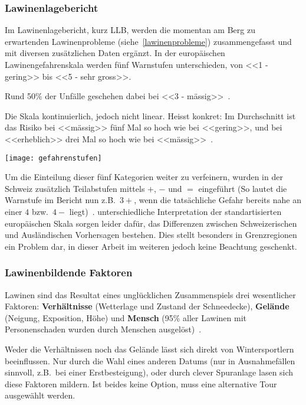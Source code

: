 \subsubsection{Lawinenlagebericht}

Im Lawinenlagebericht, kurz LLB, werden die momentan am Berg zu erwartenden Lawinenprobleme (siehe~\ref{lawinenprobleme}) zusammengefasst und mit diversen zusätzlichen Daten ergänzt.
In der europäischen Lawinengefahrenskala werden fünf Warnstufen unterschieden, von <<1 - gering>> bis <<5 - sehr gross>>. \cite{lawinengefskala}

Rund 50\% der Unfälle geschehen dabei bei <<3 - mässig>>~\cite{achtunglawine}.

Die Skala kontinuierlich, jedoch nicht linear. Heisst konkret: 
Im Durchschnitt ist das Risiko bei <<mässig>> fünf Mal so hoch wie bei <<gering>>, und bei <<erheblich>> drei Mal so hoch wie bei <<mässig>>~\cite{sacbergspwinter}.

\begin{Figure}
  \centering
  \texttt{[image: gefahrenstufen]}
\end{Figure}

Um die Einteilung dieser fünf Kategorien weiter zu verfeinern, wurden in der Schweiz zusätzlich Teilabstufen mittels $+$, $-$ und $=$ eingeführt (So lautet die Warnstufe im Bericht nun z.B.\ $3+$, wenn die tatsächliche Gefahr bereits nahe an einer $4$ bzw.\ $4-$ liegt)~\cite{sacbergspwinter}.
unterschiedliche Interpretation der standartisierten europäischen Skala sorgen leider dafür, das Differenzen zwischen Schweizerischen und Ausländischen Vorhersagen bestehen. Dies stellt besonders in Grenzregionen ein Problem dar, in dieser Arbeit im weiteren jedoch keine Beachtung geschenkt.


\subsubsection{Lawinenbildende Faktoren}

Lawinen sind das Resultat eines unglücklichen Zusammenspiels drei wesentlicher Faktoren: 
\textbf{Verhältnisse} (Wetterlage und Zustand der Schneedecke), \textbf{Gelände} (Neigung, Exposition, Höhe) und \textbf{Mensch} (95\% aller Lawinen mit Personenschaden wurden durch Menschen ausgelöst)~\cite{ortovoxlabsnow}.

Weder die Verhältnissen noch das Gelände lässt sich direkt von Wintersportlern beeinflussen. Nur durch die Wahl eines anderen Datums (nur in Ausnahmefällen sinnvoll, z.B.\ bei einer Erstbesteigung), oder durch clever Spuranlage lasen sich diese Faktoren mildern. 
Ist beides keine Option, muss eine alternative Tour ausgewählt werden.

